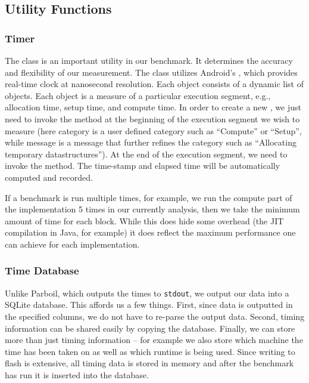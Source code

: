 \subsection{Utility Functions}
\subsubsection{Timer}
The  class is an important utility in our benchmark. It
determines the accuracy and flexibility of our measurement. The 
class utilizes Android's , which provides real-time clock at
nanosecond resolution. Each  object consists of a dynamic list of
 objects. Each  object is a measure of a
particular execution segment, e.g., allocation time, setup time, and compute
time. In order to create a new , we just need to invoke the
 method at the beginning of the execution
segment we wish to measure (here category is a user defined category such as
``Compute'' or ``Setup'', while message is a message that further refines the
category such as ``Allocating temporary datastructures''). At the end of the
execution segment, we need to invoke the  method. The
time-stamp and elapsed time will be automatically computed and recorded.

If a benchmark is run multiple times, for example, we run the compute part of
the implementation 5 times in our currently analysis, then we take the minimum
amount of time for each block. While this does hide some overhead (the JIT
compilation in Java, for example) it does reflect the maximum performance one
can achieve for each implementation.

\subsubsection{Time Database}

Unlike Parboil, which outputs the times to {\tt stdout}, we output our data into
a SQLite database.  This affords us a few things.  First, since data is
outputted in the specified columns, we do not have to re-parse the output data.
Second, timing information can be shared easily by copying the database.
Finally, we can store more than just timing information -- for example we also
store which machine the time has been taken on as well as which runtime is being
used.  Since writing to flash is extensive, all timing data is stored in memory
and after the benchmark has run it is inserted into the database. 

